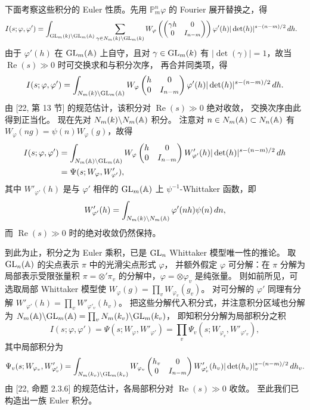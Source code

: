 下面考察这些积分的 Euler 性质。先用 $\mathbb{P}^n_m\varphi$ 的 Fourier 展开替换之，得
\[
\begin{aligned}
I(s;\varphi,\varphi')
&=\int_{\mathrm{GL}_m(k)\backslash\mathrm{GL}_m(\mathbb{A})}
\sum_{\gamma\in N_m(k)\backslash\mathrm{GL}_m(k)}
W_\varphi\left(\begin{pmatrix}\gamma h&0\\0&I_{n-m}\end{pmatrix}\right)
\varphi'(h)|\det(h)|^{s-(n-m)/2}\,dh.
\end{aligned}
\]
由于 $\varphi'(h)$ 在 $\mathrm{GL}_m(\mathbb{A})$ 上自守，且对 $\gamma\in\mathrm{GL}_m(k)$ 有
$|\det(\gamma)|=1$，故当 $\operatorname{Re}(s)\gg0$ 时可交换求和与积分次序，
再合并同类项，得
\[
I(s;\varphi,\varphi')=\int_{N_m(k)\backslash\mathrm{GL}_m(\mathbb{A})}
W_\varphi\begin{pmatrix}h&0\\0&I_{n-m}\end{pmatrix}
\varphi'(h)|\det(h)|^{s-(n-m)/2}\,dh.
\]
由 [22, 第 13 节] 的规范估计，该积分对 $\operatorname{Re}(s)\gg0$ 绝对收敛，
交换次序由此得到正当化。
现在先对 $N_m(k)\backslash N_m(\mathbb{A})$ 积分。
注意对 $n\in N_m(\mathbb{A})\subset N_n(\mathbb{A})$ 有 $W_\varphi(ng)=\psi(n)W_\varphi(g)$，故得
\[
\begin{aligned}
I(s;\varphi,\varphi')
&=\int_{N_m(\mathbb{A})\backslash\mathrm{GL}_m(\mathbb{A})}
W_\varphi\begin{pmatrix}h&0\\0&I_{n-m}\end{pmatrix}
W'_{\varphi'}(h)|\det(h)|^{s-(n-m)/2}\,dh\\
&=\Psi(s;W_\varphi,W'_{\varphi'}),
\end{aligned}
\]
其中 $W'_{\varphi'}(h)$ 是与 $\varphi'$ 相伴的 $\mathrm{GL}_m(\mathbb{A})$ 上 $\psi^{-1}$-Whittaker 函数，即
\[
W'_{\varphi'}(h)=\int_{N_m(k)\backslash N_m(\mathbb{A})}\varphi'(nh)\psi(n)\,dn,
\]
而 $\operatorname{Re}(s)\gg0$ 时的绝对收敛仍然保持。

到此为止，积分之为 Euler 乘积，已是 $\mathrm{GL}_n$ Whittaker 模型唯一性的推论。
取 $\mathrm{GL}_n(\mathbb{A})$ 的尖点表示 $\pi$ 中的光滑尖点形式 $\varphi$，
并额外假定 $\varphi$ 可分解：在 $\pi$ 分解为局部表示受限张量积
$\pi=\otimes'\pi_v$ 的分解中，$\varphi=\otimes\varphi_v$ 是纯张量。
则如前所见，可选取局部 Whittaker 模型使
$W_\varphi(g)=\prod_v W_{\varphi_v}(g_v)$。
对可分解的 $\varphi'$ 同理有分解 $W'_{\varphi'}(h)=\prod_v W'_{\varphi'_v}(h_v)$。
把这些分解代入积分式，并注意积分区域也分解为
$N_m(\mathbb{A})\backslash\mathrm{GL}_m(\mathbb{A})=\prod_v N_m(k_v)\backslash\mathrm{GL}_m(k_v)$，
即知积分分解为局部积分之积
\[
I(s;\varphi,\varphi')=\Psi(s;W_\varphi,W'_{\varphi'})
=\prod_v\Psi_v(s;W_{\varphi_v},W'_{\varphi'_v}),
\]
其中局部积分为
\[
\Psi_v(s;W_{\varphi_v},W'_{\varphi'_v})
=\int_{N_m(k_v)\backslash\mathrm{GL}_m(k_v)}
W_{\varphi_v}\begin{pmatrix}h_v&0\\0&I_{n-m}\end{pmatrix}
W'_{\varphi'_v}(h_v)|\det(h_v)|_v^{s-(n-m)/2}\,dh_v.
\]
由 [22, 命题 2.3.6] 的规范估计，各局部积分对 $\operatorname{Re}(s)\gg0$ 收敛。
至此我们已构造出一族 Euler 积分。

